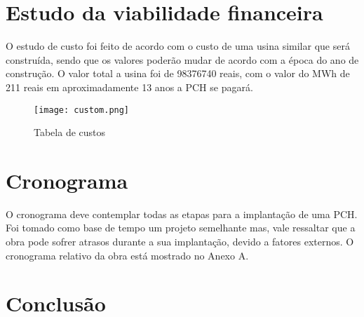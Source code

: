 \chapter{Estudo da viabilidade financeira}
O estudo de custo foi feito de acordo com o custo de uma usina similar que será construída, sendo que os valores poderão mudar de acordo com a época do ano de construção. O valor total a usina foi de 98376740 reais, com o valor do MWh de 211 reais em aproximadamente 13 anos a PCH se pagará.
\begin{figure}[h]
	\centering
	\texttt{[image: custom.png]}
	\caption{Tabela de custos}
	\label{fig:custo}
\end{figure}

\chapter{Cronograma}
O cronograma deve contemplar todas as etapas para a implantação de uma PCH. Foi tomado como base de tempo um projeto semelhante mas, vale ressaltar que a obra pode sofrer atrasos durante a sua implantação, devido a fatores externos. O cronograma relativo da obra está mostrado no Anexo A.

\chapter{Conclusão}


